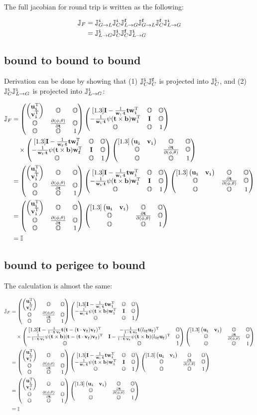 \documentclass[12pt,a4paper]{scrarticle}
\begin{document}
The full jacobian for round trip is written as the following:

\begin{align}
    \jacobianFull & = \jacobianGlobalToLocalInitial \jacobianCorrectionInitial \jacobianLocalToGlobalFinal \jacobianGlobalToLocalFinal \jacobianCorrectionFinal \jacobianLocalToGlobalInitial \\
    & = \jacobianLocalToGlobalInitial \jacobianCorrectionInitial \jacobianCorrectionFinal \jacobianLocalToGlobalInitial
\end{align}

\subsection{bound to bound to bound}

Derivation can be done by showing that (1) $\jacobianCorrectionInitial \jacobianCorrectionFinal$ is projected into $\jacobianCorrectionInitial$, and (2) $\jacobianCorrectionInitial \jacobianLocalToGlobalInitial$ is projected into $\jacobianLocalToGlobalInitial$:

\begin{align*}
    \jacobianFull & = \jacobianGlobalToLocalInitialExpansion \jacobianCorrectionInitialExpansion \\
    & \quad \times \jacobianCorrectionFinalExpansion \jacobianLocalToGlobalInitialExpansion \\
    & = \jacobianGlobalToLocalInitialExpansion \jacobianCorrectionInitialExpansion \jacobianLocalToGlobalInitialExpansion \\
    & = \jacobianGlobalToLocalInitialExpansion \jacobianLocalToGlobalInitialExpansion \\ 
    & = \IdentityMatrixFive
\end{align*}


\subsection{bound to perigee to bound}

The calculation is almost the same:

\begin{align*}
    \jacobianFull & = \jacobianGlobalToLocalInitialExpansion \jacobianCorrectionInitialExpansion \\
    & \quad \times \jacobianCorrectionFinalExpansionPerigee \jacobianLocalToGlobalInitialExpansion \\    
    & = \jacobianGlobalToLocalInitialExpansion \jacobianCorrectionInitialExpansion \jacobianLocalToGlobalInitialExpansion \\
    & = \jacobianGlobalToLocalInitialExpansion \jacobianLocalToGlobalInitialExpansion \\ 
    & = \IdentityMatrixFive
\end{align*}
\end{document}
